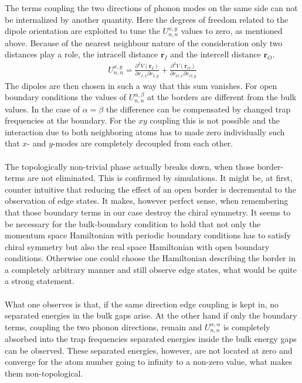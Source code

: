 The terms coupling the two directions of phonon modes on the same side can not be internalized by another quantity. Here the degrees of freedom related to the dipole orientation are exploited to tune the $U_{n,n}^{x,y}$ values to zero, as mentioned above. Because of the nearest neighbour nature of the consideration only two distances play a role, the intracell distance $\mathbf{r}_I$ and the intercell distance $\mathbf{r}_O$. 
\begin{align*}
    U_{n,n}^{x,y}= \frac{\partial^2 V(\mathbf{r}_{I})}{\partial {r}_{I,x}\partial r_{I,y}}+\frac{\partial^2 V(\mathbf{r}_{O})}{\partial {r}_{O,x}\partial r_{O,y}}
\end{align*}
The dipoles are then chosen in such a way that this sum vanishes. For open boundary conditions the values of $U_{n,n}^{\alpha,\beta}$ at the borders are different from the bulk values. In the case of $\alpha=\beta$ the difference can be compensated by changed trap frequencies at the boundary. For the $xy$ coupling this is not possible and the interaction due to both neighboring atoms has to made zero individually such that $x$- and $y$-modes are completely decoupled from each other. \\\\
The topologically non-trivial phase actually breaks down, when those border-terms are not eliminated. This is confirmed by simulations. It might be, at first, counter intuitive that reducing the effect of an open border is decremental to the observation of edge states. It makes, however perfect sense, when remembering that those boundary terms in our case destroy the chiral symmetry. It seems to be necessary for the bulk-boundary condition to hold that not only the momentum space Hamiltonian with periodic boundary conditions has to satisfy chiral symmetry but also the real space Hamiltonian with open boundary conditions. Otherwise one could choose the Hamiltonian describing the border in a completely arbitrary manner and still observe edge states, what would be quite a strong statement.\\\\
What one observes is that, if the same direction edge coupling is kept in, no separated energies in the bulk gaps arise. At the other hand if only the boundary terms, coupling the two phonon directions, remain and $U_{n,n}^{\alpha,\alpha}$ is completely absorbed into the trap frequencies separated energies inside the bulk energy gaps can be observed. These separated energies, however, are not located at zero and converge for the atom number going to infinity to a non-zero value, what makes them non-topological. 




